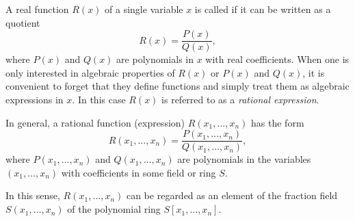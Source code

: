 \documentclass[12pt]{article}
\begin{document}
A real function $R(x)$ of a single variable $x$ is called
\emph{} if it can be written as a quotient
\[ R(x) = \frac{P(x)}{Q(x)}, \]
where $P(x)$ and $Q(x)$ are polynomials in $x$ with real coefficients. When one is only interested in algebraic properties of $R(x)$ or $P(x)$ and $Q(x)$, it is convenient to forget that they define functions and simply treat them as algebraic expressions in $x$. In this case $R(x)$ is referred to as a \emph{rational expression}.

In general, a rational function (expression) $R(x_1,\ldots,x_n)$ has the form
\[ R(x_1,\ldots,x_n) = \frac{P(x_1,\ldots,x_n)}{Q(x_1,\ldots,x_n)}, \]
where $P(x_1,\ldots,x_n)$ and $Q(x_1,\ldots,x_n)$ are polynomials in the
variables $(x_1,\ldots,x_n)$ with coefficients in some field or
ring $S$.

In this sense, $R(x_1,\ldots,x_n)$ can be regarded as an element of the fraction
field $S(x_1,\ldots,x_n)$ of the polynomial ring $S[x_1,\ldots,x_n]$.
\end{document}
